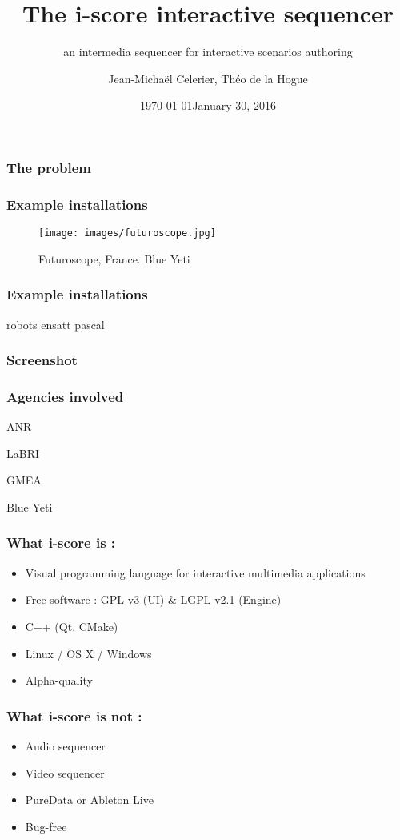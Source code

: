 \documentclass{beamer}
\title{The i-score interactive sequencer}
\subtitle{an intermedia sequencer for interactive scenarios authoring}
\date{\today}
\author{Jean-Michaël Celerier, Théo de la Hogue}
\institute{LaBRI, Blue Yeti, GMEA }
\date{January 30, 2016}
\begin{document}
    
\maketitle

\begin{frame}
    \frametitle{The problem}        
\end{frame}

\begin{frame}
    \frametitle{Example installations}        

    \begin{figure}
        \centering
        \texttt{[image: images/futuroscope.jpg]}
        \caption[]{Futuroscope, France. Blue Yeti}
    \end{figure}
\end{frame}


\begin{frame}
    \frametitle{Example installations}        
    robots
    ensatt
    pascal
    
\end{frame}

\begin{frame}
    \frametitle{Screenshot}        
\end{frame}


\begin{frame}
    \frametitle{Agencies involved}
    ANR
    
    LaBRI
    
    GMEA
    
    Blue Yeti
    
\end{frame}

    \begin{frame}
        \frametitle{What i-score is : }
        \begin{itemize}        
        \item Visual programming language for interactive multimedia applications        
        \item Free software : GPL v3 (UI) \& LGPL v2.1 (Engine)
        \item C++ (Qt, CMake)        
        \item Linux / OS X / Windows        
        \item Alpha-quality 
        \end{itemize}
    \end{frame}
    \begin{frame}
        \frametitle{What i-score is not : }
        \begin{itemize}
            \item Audio sequencer        
            \item Video sequencer        
            \item PureData or Ableton Live       
            \item Bug-free
        \end{itemize}
    \end{frame}
    
\end{document}

